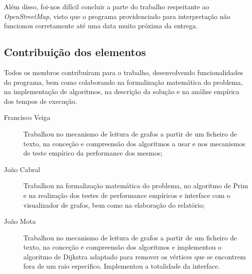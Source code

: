 \documentclass[a4paper,12pt,titlepage]{article}
\begin{document}
Além disso, foi-nos difícil concluir a parte do trabalho respeitante ao \emph{OpenStreetMap}, visto que o programa providenciado para interpretação não funcionou corretamente até uma data muito próxima da entrega.
\subsection{Contribuição dos elementos}
Todos os membros contribuíram para o trabalho, desenvolvendo funcionalidades do programa, bem como colaborando na formalização matemática do problema, na implementação de algoritmos, na descrição da solução e na análise empírica dos tempos de execução.
\begin{description}
\item[Francisco Veiga] Trabalhou no mecanismo de leitura de grafos a partir de um ficheiro de texto, na conceção e compreensão dos algoritmos a usar e nos mecanismos de teste empírico da performance dos mesmos;
\item[João Cabral] Trabalhou na formalização matemática do problema, no algoritmo de Prim e na realização dos testes de performance empíricos e interface com o visualizador de grafos, bem como na elaboração do relatório;
\item[João Mota] Trabalhou no mecanismo de leitura de grafos a partir de um ficheiro de texto, na conceção e compreensão dos algoritmos e implementou o algoritmo de Dijkstra adaptado para remover os vértices que se encontrem fora de um raio especifico. Implementou a totalidade da interface.


\end{description}

\newpage


\end{document}
